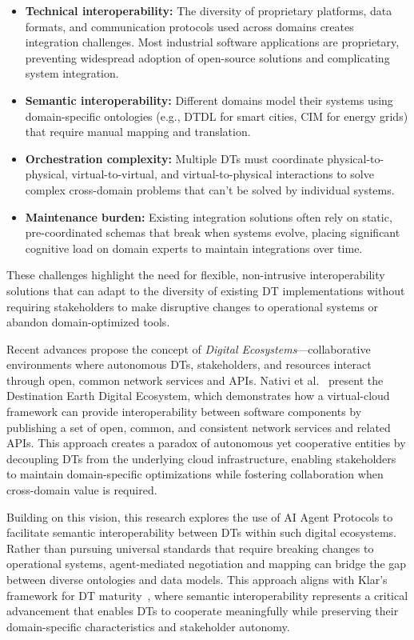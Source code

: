 \begin{itemize}
    \item \textbf{Technical interoperability:} The diversity of proprietary platforms, data formats, and communication protocols used across domains creates integration challenges. Most industrial software applications are proprietary, preventing widespread adoption of open-source solutions and complicating system integration.
    
    \item \textbf{Semantic interoperability:} Different domains model their systems using domain-specific ontologies (e.g., DTDL for smart cities, CIM for energy grids) that require manual mapping and translation.

    \item \textbf{Orchestration complexity:} Multiple DTs must coordinate physical-to-physical, virtual-to-virtual, and virtual-to-physical interactions to solve complex cross-domain problems that can't be solved by individual systems.

    \item \textbf{Maintenance burden:} Existing integration solutions often rely on static, pre-coordinated schemas that break when systems evolve, placing significant cognitive load on domain experts to maintain integrations over time.
\end{itemize}

These challenges highlight the need for flexible, non-intrusive interoperability solutions that can adapt to the diversity of existing DT implementations without requiring stakeholders to make disruptive changes to operational systems or abandon domain-optimized tools.

Recent advances propose the concept of \emph{Digital Ecosystems}---collaborative environments where autonomous DTs, stakeholders, and resources interact through open, common network services and APIs.
Nativi et al.~\cite{Nativi_2021} present the Destination Earth Digital Ecosystem, 
    which demonstrates how a virtual-cloud framework can provide interoperability between software components 
    by publishing a set of open, common, and consistent network services and related APIs.
This approach creates a paradox of autonomous yet cooperative entities by decoupling DTs from the underlying cloud infrastructure, 
    enabling stakeholders to maintain domain-specific optimizations while fostering collaboration when cross-domain value is required.

Building on this vision, this research explores the use of AI Agent Protocols
    to facilitate semantic interoperability between DTs within such digital ecosystems.
Rather than pursuing universal standards that require breaking changes to operational systems, agent-mediated negotiation and mapping can bridge the gap between diverse ontologies and data models.
This approach aligns with Klar's framework for DT maturity~\cite{Klar_2024},
    where semantic interoperability represents a critical advancement that enables DTs to cooperate meaningfully while preserving their domain-specific characteristics and stakeholder autonomy.

